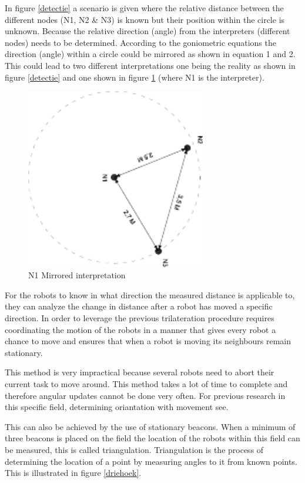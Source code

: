 \documentclass[10pt,a4paper]{article}
\begin{document}
In figure \ref{detectie} a scenario is given where the relative distance between the different nodes (N1, N2 \& N3) is known but their position within the circle is unknown. Because the relative direction (angle) from the interpreters (different nodes) needs to be determined. According to the goniometric equations the direction (angle) within a circle could be mirrored as shown in equation 1 and 2. This could lead to two different interpretations one being the reality as shown in figure \ref{detectie} and one shown in figure \ref{mirror} (where N1 is the interpreter). 

\begin{figure}[H]
\centering
\includegraphics[angle=90,width=0.7\textwidth]{Mirror.pdf}
\caption{N1 Mirrored interpretation}
\label{mirror}
\end{figure}

For the robots to know in what direction the measured distance is applicable to, they can analyze the change in distance after a robot has moved a specific direction. In order to leverage the previous trilateration procedure requires coordinating the motion of the robots in a manner that gives every robot a chance to move and ensures that when a robot is moving its neighbours remain stationary. \cite{Angle}

This method is very impractical because several robots need to abort their current task to move around. This method takes a lot of time to complete and therefore angular updates cannot be done very often. For previous research in this specific field, determining oriantation with movement see.\cite{delft}

This can also be achieved by the use of stationary beacons. When a minimum of three beacons is placed on the field the location of the robots within this field can be measured, this is called triangulation. Triangulation is the process of determining the location of a point by measuring angles to it from known points. This is illustrated in figure \ref{driehoek}.
\end{document}
